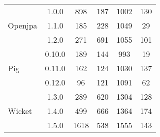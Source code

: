 \begin{table}[htb!]
{\begin{tabular}{l||c|c|c|c|c}
		&1.0.0	&	898	&	187	&	1002	&	130		 \\
Openjpa		&1.1.0	&	185	&	228	&	1049	&	29		 \\
		&1.2.0	&	271	&	691	&	1055	&	101		 \\\hline
		&0.10.0	&	189	&	144	&	993	&	19		 \\
Pig		&0.11.0	&	162	&	124	&	1030	&	137		 \\
		&0.12.0	&	96	&	121	&	1091	&	62		 \\\hline
		&1.3.0	&	289	&	620	&	1304	&	128		 \\
Wicket		&1.4.0	&	499	&	666	&	1364	&	174		 \\
		&1.5.0	&	1618	&	538	&	1555	&	143		 \\\hline


\end{tabular}
}
\end{table}
